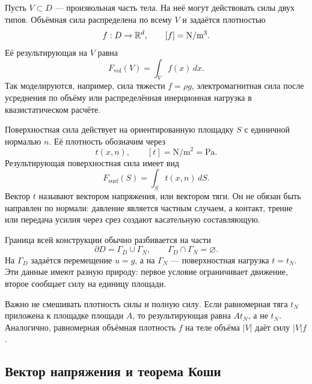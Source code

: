 Пусть $V\subset D$ --- произвольная часть тела. На неё могут действовать силы двух типов. Объёмная сила распределена по всему $V$ и задаётся плотностью
\begin{equation}
\label{eq:body-force-density-v02}
f:D\to\mathbb{R}^d,
\qquad
[f]=\mathrm{N}/\mathrm{m}^3.
\end{equation}
Её результирующая на $V$ равна
\begin{equation}
\label{eq:body-force-resultant-v02}
F_{\mathrm{vol}}(V)=\int_V f(x)\,dx.
\end{equation}
Так моделируются, например, сила тяжести $f=\rho g$, электромагнитная сила после усреднения по объёму или распределённая инерционная нагрузка в квазистатическом расчёте.

Поверхностная сила действует на ориентированную площадку $S$ с единичной нормалью $n$. Её плотность обозначим через
\begin{equation}
\label{eq:traction-field-v02}
t(x,n),
\qquad
[t]=\mathrm{N}/\mathrm{m}^2=\mathrm{Pa}.
\end{equation}
Результирующая поверхностная сила имеет вид
\begin{equation}
\label{eq:surface-force-resultant-v02}
F_{\mathrm{surf}}(S)=\int_S t(x,n)\,dS.
\end{equation}
Вектор $t$ называют вектором напряжения, или вектором тяги. Он не обязан быть направлен по нормали: давление является частным случаем, а контакт, трение или передача усилия через срез создают касательную составляющую.

Граница всей конструкции обычно разбивается на части
\begin{equation}
\label{eq:boundary-split-v02}
\partial D=\Gamma_D\cup\Gamma_N,
\qquad
\Gamma_D\cap\Gamma_N=\varnothing.
\end{equation}
На $\Gamma_D$ задаётся перемещение $u=g$, а на $\Gamma_N$ --- поверхностная нагрузка $t=t_N$. Эти данные имеют разную природу: первое условие ограничивает движение, второе сообщает силу на единицу площади.

Важно не смешивать плотность силы и полную силу. Если равномерная тяга $t_N$ приложена к площадке площади $A$, то результирующая равна $A t_N$, а не $t_N$. Аналогично, равномерная объёмная плотность $f$ на теле объёма $|V|$ даёт силу $|V|f$.

\subsection{Вектор напряжения и теорема Коши}

